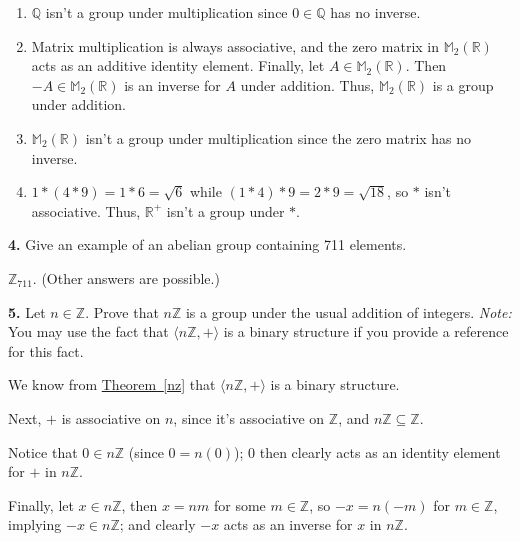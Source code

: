 \documentclass[10pt,]{book}
\theoremstyle{plain}
\theoremstyle{definition}
\theoremstyle{definition}
\theoremstyle{definition}
\theoremstyle{definition}
\numberwithin{equation}{section}
\def\Z{\mathbb{Z}}
\def\R{\mathbb{R}}
\def\Q{\mathbb{Q}}
\def\M{\mathbb{M}}
\begin{document}
\par\smallskip
\leavevmode%
\begin{enumerate}[label=(\alph*)]
\item\hypertarget{li-115}{}
        \(\Q\) isn't a group under multiplication since \(0\in \Q\) has no inverse.
\item\hypertarget{li-116}{}Matrix multiplication is always associative, and the zero matrix in \(\M_2(\R)\) acts as an additive identity element.            Finally, let \(A\in \M_2(\R)\).  Then \(-A\in \M_2(\R)\) is an inverse for \(A\) under addition. Thus, \(\M_2(\R)\) is a group under addition.%
\item\hypertarget{li-117}{}
        \(\M_2(\R)\) isn't a group under multiplication since the zero matrix has no inverse.
\item\hypertarget{li-118}{}
        \(1*(4*9)=1*6=\sqrt{6}\) while \((1*4)*9=2*9=\sqrt{18}\), so \(*\) isn't associative.  Thus, \(\R^+\) isn't a group under \(*\).
\end{enumerate}
\par\smallskip
\noindent\textbf{4.}\quad{}
        Give an example of an abelian group containing 711 elements.
\par\smallskip

      \(\Z_{711}\). (Other answers are possible.)
\par\smallskip
\noindent\textbf{5.}\quad{}
        Let \(n\in \Z\). Prove that \(n\Z\) is a group under the usual addition of integers. \emph{Note:} You may use the fact that \(\langle n\Z,+\rangle\) is a binary structure if you provide a reference for this fact.
\par\smallskip

      We know from \hyperref[nz]{Theorem~\ref{nz}} that \(\langle n\Z,+\rangle\) is a binary structure.%
\par
 Next, \(+\) is
            associative on \(n\), since it's associative on
            \(\Z\), and \(n\Z \subseteq \Z\).
\par
            Notice that
            \(0\in n\Z\) (since \(0=n(0)\)); 0 then clearly acts as
            an identity element for \(+\) in \(n\Z\).
\par
Finally, let \(x\in n\Z\), then \(x=nm\) for some \(m\in \Z\), so
            \(-x=n(-m)\) for \(m\in \Z\), implying \(-x\in n\Z\);
            and clearly \(-x\) acts as an inverse for \(x\) in
            \(n\Z\).
\par
\end{document}
